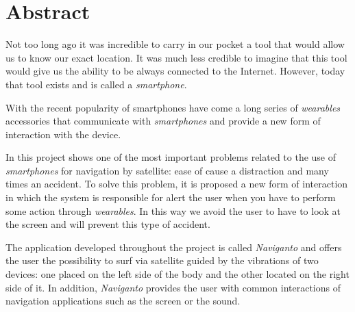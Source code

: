 \chapter{Abstract}

Not too long ago it was incredible to carry in our pocket a tool that would allow us to know our
exact location. It was much less credible to imagine that this tool would give us the ability to be
always connected to the Internet. However, today that tool exists and is called a \emph{smartphone}.

With the recent popularity of smartphones have come a long series of \emph{wearables} accessories
that communicate with \emph{smartphones} and provide a new form of interaction with the device.

In this project shows one of the most important problems related to the use of \emph{smartphones}
for navigation by satellite: ease of cause a distraction and many times an accident. To solve this
problem, it is proposed a new form of interaction in which the system is responsible for alert the
user when you have to perform some action through \emph{wearables}. In this way we avoid the user to
have to look at the screen and will prevent this type of accident.

The application developed throughout the project is called \emph{Naviganto} and offers the user the
possibility to surf via satellite guided by the vibrations of two devices: one placed on the left
side of the body and the other located on the right side of it. In addition, \emph{Naviganto}
provides the user with common interactions of navigation applications such as the screen or the
sound.

